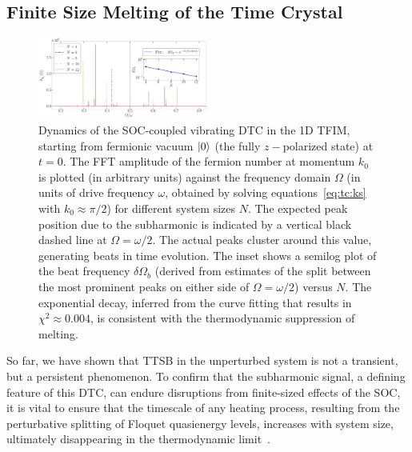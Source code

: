 \documentclass[preprint,5p,times,twocolumn]{elsarticle}
\begin{document}
\subsection{Finite Size Melting of the Time Crystal}
\label{subsec:melting}
\begin{figure}[t!]
    \begin{center}
        \includegraphics[width=0.5\textwidth, keepaspectratio]{fig3_finite_size.png}    
    \end{center}
    \caption{Dynamics of the SOC-coupled vibrating DTC in the 1D TFIM, starting from fermionic vacuum $\ket{0}$ (the fully $z-$polarized state) at $t=0$. The FFT amplitude of the fermion number at momentum $k_0$ is plotted (in arbitrary units) against the frequency domain $\Omega$ (in units of drive frequency $\omega$, obtained by solving equations~\ref{eq:tc:ks} with $k_0\approx\pi/2$) for different system sizes $N$. The expected peak position due to the subharmonic is indicated by a vertical black dashed line at $\Omega=\omega/2$. The actual peaks cluster around this value, generating beats in time evolution. The inset shows a semilog plot of the beat frequency $\delta\Omega_b$ (derived from estimates of the split between the most prominent peaks on either side of $\Omega=\omega/2$) versus $N$. The exponential decay, inferred from the curve fitting that results in $\chi^2\approx 0.004$, is consistent with the thermodynamic suppression of melting.}
    \label{fig:finitesize:melting}
\end{figure}

So far, we have shown that TTSB in the unperturbed system is not a transient, but a persistent phenomenon. To confirm that the subharmonic signal, a defining feature of this DTC, can endure disruptions from finite-sized effects of the SOC, it is vital to ensure that the timescale of any heating process, resulting from the perturbative splitting of Floquet quasienergy levels, increases with system size, ultimately disappearing in the thermodynamic limit~\citep{PhysRevLett.117.090402, melting:khemani}.
\end{document}
